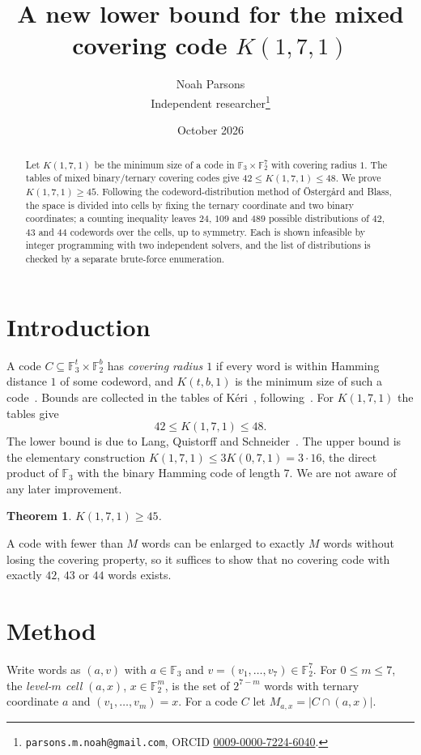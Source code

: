 \documentclass[11pt]{article}
\title{A new lower bound for the mixed covering code $K(1,7,1)$}
\author{Noah Parsons\\ \small Independent researcher\thanks{%
\texttt{parsons.m.noah@gmail.com}, ORCID \href{https://orcid.org/0009-0000-7224-6040}{0009-0000-7224-6040}.}}
\date{October 2026}
\newtheorem{theorem}{Theorem}
\theoremstyle{remark}
\newcommand{\F}{\mathbb{F}}
\begin{document}
\maketitle

\begin{abstract}
Let $K(1,7,1)$ be the minimum size of a code in $\F_3\times\F_2^7$ with covering radius $1$. The
tables of mixed binary/ternary covering codes give $42\le K(1,7,1)\le 48$. We prove
$K(1,7,1)\ge 45$. Following the codeword-distribution method of Östergård and Blass, the space is
divided into cells by fixing the ternary coordinate and two binary coordinates; a counting
inequality leaves $24$, $109$ and $489$ possible distributions of $42$, $43$ and $44$ codewords
over the cells, up to symmetry. Each is shown infeasible by integer programming with two independent
solvers, and the list of distributions is checked by a separate brute-force enumeration.
\end{abstract}

\section{Introduction}

A code $C\subseteq\F_3^t\times\F_2^b$ has \emph{covering radius $1$} if every word is within
Hamming distance $1$ of some codeword, and $K(t,b,1)$ is the minimum size of such a
code~\cite{cohen-book}. Bounds are collected in the tables of K\'eri~\cite{keri},
following~\cite{oh,bow}. For $K(1,7,1)$ the tables give
\[
42\le K(1,7,1)\le 48 .
\]
The lower bound is due to Lang, Quistorff and Schneider~\cite{lqs}. The upper bound is the
elementary construction $K(1,7,1)\le 3K(0,7,1)=3\cdot 16$, the direct product of $\F_3$ with the
binary Hamming code of length $7$. We are not aware of any later improvement.

\begin{theorem}\label{thm:main}
$K(1,7,1)\ge 45$.
\end{theorem}

A code with fewer than $M$ words can be enlarged to exactly $M$ words without losing the covering
property, so it suffices to show that no covering code with exactly $42$, $43$ or $44$ words
exists.

\section{Method}

Write words as $(a,v)$ with $a\in\F_3$ and $v=(v_1,\dots,v_7)\in\F_2^7$. For $0\le m\le 7$, the
\emph{level-$m$ cell} $(a,x)$, $x\in\F_2^m$, is the set of $2^{7-m}$ words with ternary
coordinate $a$ and $(v_1,\dots,v_m)=x$. For a code $C$ let $M_{a,x}=|C\cap(a,x)|$.
\end{document}
